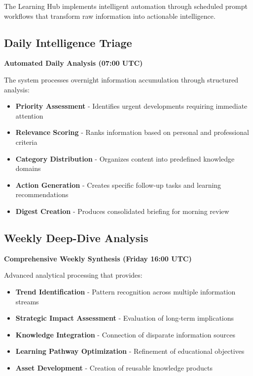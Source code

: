 \documentclass[
  letterpaper,
  DIV=11,
  numbers=noendperiod]{scrartcl}
\providecommand{\tightlist}{%
  \setlength{\itemsep}{0pt}\setlength{\parskip}{0pt}}\usepackage{longtable,booktabs,array}
\begin{document}
The Learning Hub implements intelligent automation through scheduled
prompt workflows that transform raw information into actionable
intelligence.

\subsection{Daily Intelligence Triage}\label{daily-intelligence-triage}

\textbf{Automated Daily Analysis (07:00 UTC)}

The system processes overnight information accumulation through
structured analysis:

\begin{itemize}
\tightlist
\item
  \textbf{Priority Assessment} - Identifies urgent developments
  requiring immediate attention
\item
  \textbf{Relevance Scoring} - Ranks information based on personal and
  professional criteria
\item
  \textbf{Category Distribution} - Organizes content into predefined
  knowledge domains
\item
  \textbf{Action Generation} - Creates specific follow-up tasks and
  learning recommendations
\item
  \textbf{Digest Creation} - Produces consolidated briefing for morning
  review
\end{itemize}

\subsection{Weekly Deep-Dive Analysis}\label{weekly-deep-dive-analysis}

\textbf{Comprehensive Weekly Synthesis (Friday 16:00 UTC)}

Advanced analytical processing that provides:

\begin{itemize}
\tightlist
\item
  \textbf{Trend Identification} - Pattern recognition across multiple
  information streams
\item
  \textbf{Strategic Impact Assessment} - Evaluation of long-term
  implications
\item
  \textbf{Knowledge Integration} - Connection of disparate information
  sources
\item
  \textbf{Learning Pathway Optimization} - Refinement of educational
  objectives
\item
  \textbf{Asset Development} - Creation of reusable knowledge products
\end{itemize}
\end{document}
